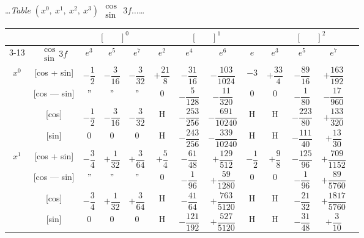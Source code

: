 \documentclass[10pt,a4paper]{article}
\newcommand{\tabletitle}[2]{%
  \begin{center}
  \ldots\textit{Table} #1 $\displaystyle\begin{smallmatrix} \cos \\ \sin \end{smallmatrix}$ #2\ldots
  \end{center}
}
\begin{document}
\newpage

\tabletitle{$(x^0,\ x^1,\ x^2,\ x^3)$}{$3f\ldots$}

\begin{center}
\small
\begin{tabular}{|c|c|c|c|c|c|c|c|c|c|c|c|c|}
\hline
& & \multicolumn{3}{c|}{$[\phantom{()}]^0$} & \multicolumn{4}{c|}{$[\phantom{()}]^1$} & \multicolumn{4}{c|}{$[\phantom{()}]^2$} \\
\cline{3-13}
& $\begin{smallmatrix} \cos \\ \sin \end{smallmatrix} 3f$ & $e^3$ & $e^5$ & $e^7$ & $e^2$ & $e^4$ & $e^6$ & $e$ & $e^3$ & $e^5$ & $e^7$ \\
\hline
\multirow{4}{*}{$x^0$} & [cos + sin] & $-\dfrac{1}{2}$ & $-\dfrac{3}{16}$ & $-\dfrac{3}{32}$ & $+\dfrac{21}{8}$ & $-\dfrac{31}{16}$ & $-\dfrac{103}{1024}$ & $-3$ & $+\dfrac{33}{4}$ & $-\dfrac{89}{16}$ & $+\dfrac{163}{192}$ \\
& [cos --- sin] & $"$ & $"$ & $"$ & $0$ & $-\dfrac{5}{128}$ & $-\dfrac{11}{320}$ & $0$ & $0$ & $-\dfrac{1}{80}$ & $-\dfrac{17}{960}$ \\
& [cos] & $-\dfrac{1}{2}$ & $-\dfrac{3}{16}$ & $-\dfrac{3}{32}$ & H & $-\dfrac{253}{256}$ & $-\dfrac{691}{10240}$ & H & H & $-\dfrac{223}{80}$ & $+\dfrac{133}{320}$ \\
& [sin] & $0$ & $0$ & $0$ & H & $-\dfrac{243}{256}$ & $-\dfrac{339}{10240}$ & H & H & $-\dfrac{111}{40}$ & $+\dfrac{13}{30}$ \\
\hline
\multirow{4}{*}{$x^1$} & [cos + sin] & $-\dfrac{3}{4}$ & $+\dfrac{1}{32}$ & $+\dfrac{3}{64}$ & $+\dfrac{5}{4}$ & $-\dfrac{61}{48}$ & $+\dfrac{129}{512}$ & $-\dfrac{1}{2}$ & $+\dfrac{9}{8}$ & $-\dfrac{125}{96}$ & $+\dfrac{709}{1152}$ \\
& [cos --- sin] & $"$ & $"$ & $"$ & $0$ & $-\dfrac{1}{96}$ & $+\dfrac{59}{1280}$ & $0$ & $0$ & $-\dfrac{1}{96}$ & $+\dfrac{89}{5760}$ \\
& [cos] & $-\dfrac{3}{4}$ & $+\dfrac{1}{32}$ & $+\dfrac{3}{64}$ & H & $-\dfrac{41}{64}$ & $+\dfrac{763}{5120}$ & H & H & $-\dfrac{21}{32}$ & $+\dfrac{1817}{5760}$ \\
& [sin] & $0$ & $0$ & $0$ & H & $-\dfrac{121}{192}$ & $+\dfrac{527}{5120}$ & H & H & $-\dfrac{31}{48}$ & $+\dfrac{3}{10}$ \\

\end{tabular}
\end{center}
\end{document}
